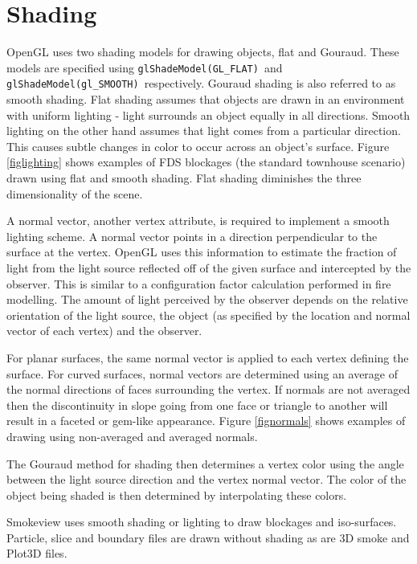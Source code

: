 \documentclass[11pt,twoside]{book}
\begin{document}
\section{Shading} OpenGL uses two shading models for drawing
objects, flat and Gouraud.  These models are specified
using {\tt glShadeModel(GL\_FLAT)}\ and {\tt glShadeModel(gl\_SMOOTH)}\
respectively.
Gouraud shading is also
referred to as smooth shading.  Flat shading assumes that objects
are drawn in an environment with uniform lighting - light
surrounds an object equally in all directions. Smooth lighting on
the other hand assumes that light comes from a particular
direction.  This causes subtle changes in color to occur across an
object's surface. Figure \ref{figlighting} shows examples of FDS
blockages (the standard townhouse scenario) drawn using flat and
smooth shading. Flat shading diminishes the three dimensionality of
the scene.

A normal vector, another vertex attribute, is required to
implement a smooth lighting scheme. A normal vector points in a
direction perpendicular to the surface at the vertex. OpenGL uses
this information to estimate the fraction of light from the light
source reflected off of the given surface and intercepted by the
observer.  This is similar to a configuration factor calculation
performed in fire modelling.  The amount of light perceived by the
observer depends on the relative orientation of the light source,
the object (as specified by the location and normal vector of each
vertex) and the observer.

For planar surfaces, the same normal vector is applied to each
vertex defining the surface. For curved surfaces, normal vectors
are determined using an average of the normal directions of faces
surrounding the vertex.  If normals are not averaged then the
discontinuity in slope going from one face or triangle to another
will result in a faceted or gem-like appearance.  Figure
\ref{fignormals} shows examples of drawing using non-averaged and
averaged normals.

The Gouraud method for shading then determines a vertex color
using the angle between the light source direction and the vertex
normal vector. The color of the object being shaded is then
determined by interpolating these colors.

Smokeview uses smooth shading or lighting to draw blockages and
iso-surfaces. Particle, slice and boundary files are drawn without
shading as are 3D smoke and Plot3D files.
\end{document}
